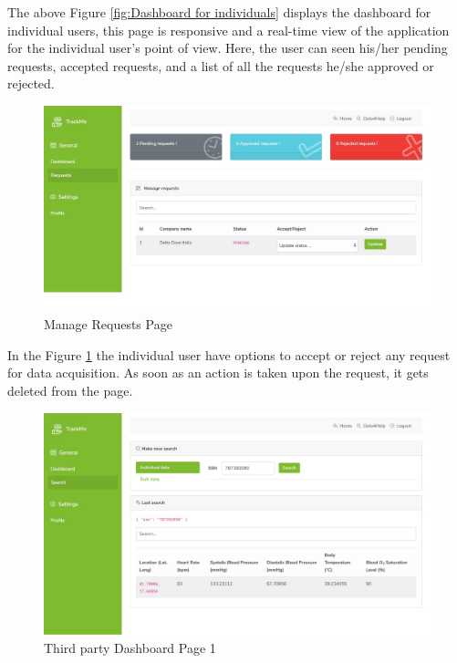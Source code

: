 \documentclass[a4paper, hidelinks, 12pt]{report}
\begin{document}
The above Figure \ref{fig:Dashboard for individuals} displays the dashboard for individual users, this page is responsive and a real-time view of the application for the individual user's point of view. Here, the user can seen his/her pending requests, accepted requests, and a list of all the requests he/she approved or rejected.

	\begin{figure}[H]
		\centering
		\includegraphics[width=1\textwidth]{UI/UI/4.jpeg}
		\caption[UI: Manage Requests Page]{Manage Requests Page}
		\label{fig:manage_requests}
	\end{figure}

In the Figure \ref{fig:manage_requests} the individual user have options to accept or reject any request for data acquisition. As soon as an action is taken upon the request, it gets deleted from the page.

	\begin{figure}[H]
		\centering
		\includegraphics[width=1\textwidth]{UI/UI/5.jpeg}
		\caption[UI: Third party Dashboard Page 1]{Third party Dashboard Page 1}
		\label{fig:third_party_dashboard_1}
	\end{figure}
	
\end{document}
